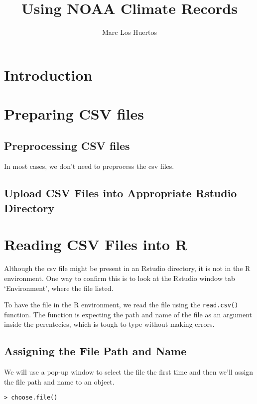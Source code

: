 \documentclass{article}\usepackage[]{graphicx}\usepackage[]{color}
\title{Using NOAA Climate Records}
\author{Marc Los Huertos}
\begin{document}
\maketitle

\section{Introduction}



\section{Preparing CSV files}

\subsection{Preprocessing CSV files}

In most cases, we don't need to preprocess the csv files.

\subsection{Upload CSV Files into Appropriate Rstudio Directory}

\section{Reading CSV Files into R}

Although the csv file might be present in an Rstudio directory, it is not in the R environment. One way to confirm this is to look at the Rstudio window tab `Environment', where the file listed. 

To have the file in the R environment, we read the file using the \verb!read.csv()! function. The function is expecting the path and name of the file as an argument inside the perentecies, which is tough to type without making errors. 

\subsection{Assigning the File Path and Name}

We will use a pop-up window to select the file the first time and then we'll assign the file path and name to an object. 

\begin{verbatim}
> choose.file()
\end{verbatim}
\end{document}
